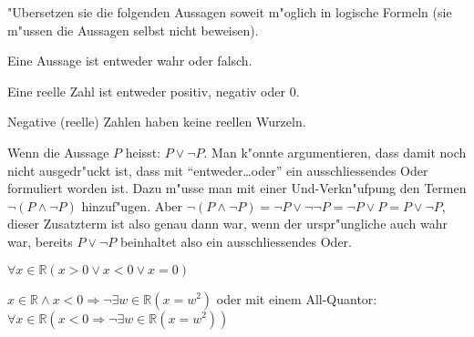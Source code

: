 "Ubersetzen sie die folgenden Aussagen soweit m"oglich in
logische Formeln (sie m"ussen die Aussagen selbst nicht beweisen).
\begin{teilaufgaben}
\item Eine Aussage ist entweder wahr oder falsch.
\item Eine reelle Zahl ist entweder positiv, negativ oder $0$.
\item Negative (reelle) Zahlen haben keine reellen Wurzeln.
\end{teilaufgaben}

\begin{loesung}
\begin{teilaufgaben}
\item Wenn die Aussage $P$ heisst: $P\vee\neg P$.
Man k"onnte argumentieren, dass damit noch nicht ausgedr"uckt ist,
dass mit ``entweder\dots oder'' ein ausschliessendes Oder formuliert
worden ist. Dazu m"usse man mit einer Und-Verkn"ufpung den Termen
$\neg(P\wedge \neg P)$
hinzuf"ugen. Aber
$\neg(P\wedge \neg P)=\neg P\vee \neg\neg P=\neg P\vee P=P\vee\neg P$,
dieser Zusatzterm ist also genau dann war, wenn der urspr"ungliche
auch wahr war, bereits $P\vee \neg P$ beinhaltet also ein ausschliessendes
Oder.
\item $\forall x\in\mathbb R(x > 0\vee x<0\vee x=0)$
\item $x\in\mathbb R\wedge x < 0\Rightarrow
\neg\exists w\in\mathbb R(x=w^2)$
oder mit einem All-Quantor: $\forall x\in\mathbb R(x<0\Rightarrow
\neg\exists w\in\mathbb R(x=w^2))$
\end{teilaufgaben}
\end{loesung}

